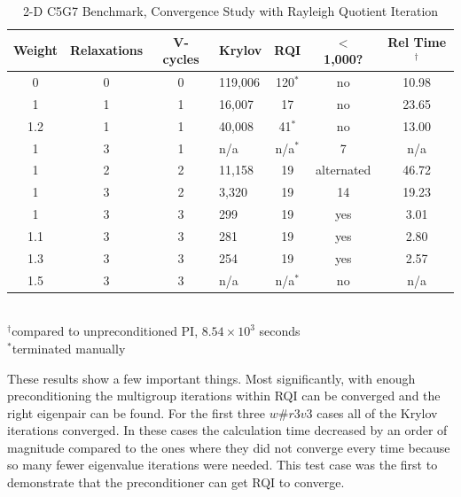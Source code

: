 \begin{table}[!h]
\caption{2-D C5G7 Benchmark, Convergence Study with Rayleigh Quotient Iteration}
\begin{center}
\begin{tabular}{| c | c | c | l | c | c | c |}
\hline
Weight & Relaxations & V-cycles & Krylov & RQI & $<$ 1,000? & Rel Time$^{\dag}$\\[0.5ex]
\hline
0    & 0 & 0 & 119,006 & 120$^{*}$ & no & 10.98 \\%
1    & 1 & 1 & 16,007   & 17            & no & 23.65 \\ %
1.2 & 1 & 1 & 40,008   & 41$^{*}$   & no & 13.00 \\ %
1    & 3 & 1 & n/a         & n/a$^{*}$  & 7   & n/a \\
1    & 2 & 2 & 11,158   & 19            & alternated & 46.72 \\ %
1    & 3 & 2 & 3,320     & 19            & 14 &19.23 \\ %
\hline
1    & 3 & 3 & 299        & 19            & yes & 3.01 \\ %
1.1 & 3 & 3 & 281        & 19            & yes & 2.80 \\ %
1.3 & 3 & 3 & 254        & 19            & yes & 2.57 \\ %
1.5 & 3 & 3 & n/a         & n/a$^{*}$ & no & n/a \\
\hline 
\end{tabular} \\
$^{\dag}$compared to unpreconditioned PI, $8.54 \times 10^{3}$ seconds\\
$^{*}$terminated manually
\end{center}
\label{table:2-D c5g7 rqi}
\end{table}
%

These results show a few important things. Most significantly, with enough preconditioning the multigroup iterations within RQI can be converged and the right eigenpair can be found. For the first three $w\#r3v3$ cases all of the Krylov iterations converged. In these cases the calculation time decreased by an order of magnitude compared to the ones where they did not converge every time because so many fewer eigenvalue iterations were needed. This test case was the first to demonstrate that the preconditioner can get RQI to converge. 

